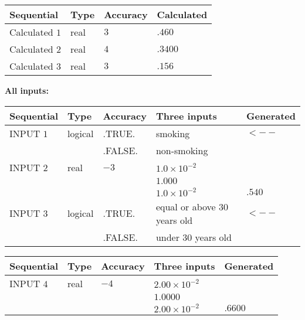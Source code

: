\documentclass[12pt]{article}
\begin{document}
   
   
   
\noindent{}
   
   
  
  
\noindent\begin{tabular}{|l|l|l|l|}
\hline
 Sequential & Type & Accuracy & Calculated \\ 
\hline
 
 
  Calculated $           1$ & real & $           3 $ & 
 $ .460 $ 
 \\  \hline  
 
 
  Calculated $           2$ & real & $           4 $ & 
 $ .3400 $ 
 \\  \hline  
 
 
  Calculated $           3$ & real & $           3 $ & 
 $ .156 $ 
 \\  \hline  
 \end{tabular}
   
   
   
   
\noindent\vspace{0.1in}\hspace{-0.08in} {\textbf{\Large{All inputs: }}}
   
   
  
  
\noindent\begin{tabular}{|l|l|l|l|l|}
\hline
 Sequential & Type & Accuracy & Three inputs & Generated \\ 
\hline
 
 
  INPUT $           1$ & logical & .TRUE. & 
 smoking & 
  $ <-- $ 
  \\
  & & .FALSE. & 
  non-smoking & 
 \\  \hline  
 
 
  INPUT $           2$ & real & $          -3 $ & $
 1.0 \times 10^{-2}
  $ & \\
  & & &  $
 1.000
  $ & \\
  & & &  $
 1.0 \times 10^{-2}
 $ & $ .540 $ 
 \\  \hline  
 
 
  INPUT $           3$ & logical & .TRUE. & 
 equal or above 30 years old & 
  $ <-- $ 
  \\
  & & .FALSE. & 
  under 30 years old & 
 \\  \hline  
 \end{tabular}
   
   
  
  
\noindent\begin{tabular}{|l|l|l|l|l|}
\hline
 Sequential & Type & Accuracy & Three inputs & Generated \\ 
\hline
 
 
  INPUT $           4$ & real & $          -4 $ & $
 2.00 \times 10^{-2}
  $ & \\
  & & &  $
 1.0000
  $ & \\
  & & &  $
 2.00 \times 10^{-2}
 $ & $ .6600 $ 
 \\  \hline  
 \end{tabular}
   
\end{document}
